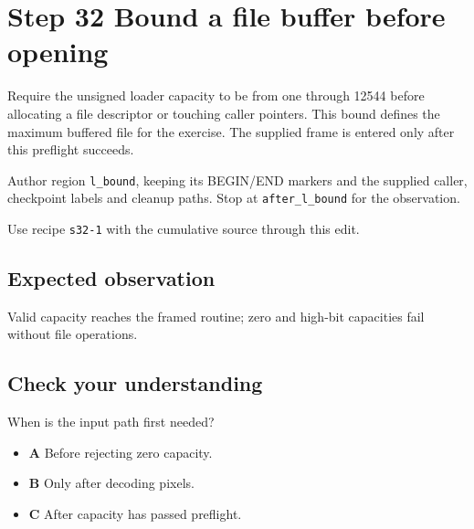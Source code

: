 \section{Step 32 Bound a file buffer before opening}\label{ppm-s32}

Require the unsigned loader capacity to be from one through 12544 before allocating a file descriptor or touching caller pointers. This bound defines the maximum buffered file for the exercise. The supplied frame is entered only after this preflight succeeds.

Author region \texttt{l\_bound}, keeping its BEGIN/END markers and the supplied caller, checkpoint labels and cleanup paths. Stop at \texttt{after\_l\_bound} for the observation.

Use recipe \texttt{s32-1} with the cumulative source through this edit.

\subsection{Expected observation}
Valid capacity reaches the framed routine; zero and high-bit capacities fail without file operations.

\subsection{Check your understanding}
When is the input path first needed?

\begin{itemize}
\item \textbf{A} Before rejecting zero capacity.
\item \textbf{B} Only after decoding pixels.
\item \textbf{C} After capacity has passed preflight.
\end{itemize}
